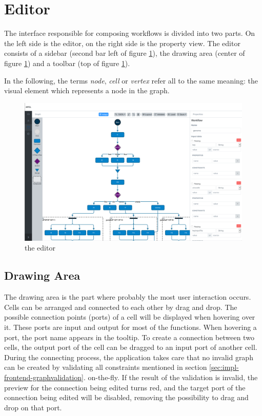 \documentclass[a4paper,top=25mm,bottom=25mm,12pt,pdftex,halfparskip,twoside,bibtotoc,numbers=noenddot]{scrbook}
\begin{document}
\section{Editor}
The interface responsible for composing workflows is divided into two parts. On the left side is the editor, on the right side is the property view. The editor consists of a sidebar (second bar left of figure \ref{fig:editor}), the drawing area (center of figure \ref{fig:editor}) and a toolbar (top of figure \ref{fig:editor}).

In the following, the terms \textit{node}, \textit{cell} or \textit{vertex} refer all to the same meaning: the visual element which represents a node in the graph.

\begin{figure}[H]
  \centering
  \includegraphics[width=\textwidth]{editor}
  \caption{the editor}
  \label{fig:editor}
\end{figure}

\subsection{Drawing Area}

The drawing area is the part where probably the most user interaction occurs.\\ Cells can be arranged and connected to each other by drag and drop.
The possible connection points (ports) of a cell will be displayed when hovering over it. These ports are input and output for most of the functions.
When hovering a port, the port name appears in the tooltip.
To create a connection between two cells, the output port of the cell can be dragged to an input port of another cell.\\
During the connecting process, the application takes care that no invalid graph can be created by validating all constraints mentioned in section \ref{sec:impl-frontend-graphvalidation}. on-the-fly. If the result of the validation is invalid, the preview for the connection being edited turns red, and the target port of the connection being edited will be disabled, removing the possibility to drag and drop on that port.
\end{document}
